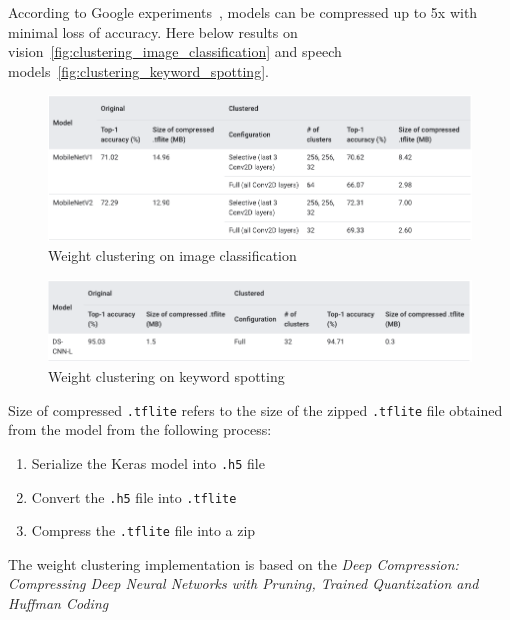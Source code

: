 According to Google experiments~\cite{tfmot:clustering}, models can be
compressed up to 5x with minimal loss of accuracy. Here below results on
vision~\autoref{fig:clustering_image_classification} and speech
models~\autoref{fig:clustering_keyword_spotting}.

\begin{figure}[ht]
    \includegraphics[width=\textwidth]{images/introduction/clustering_image_classification.png}
    \centering
    \caption{Weight clustering on image classification}\label{fig:clustering_image_classification}
\end{figure}

\begin{figure}[ht]
    \includegraphics[width=\textwidth]{images/introduction/clustering_keyword_spotting.png}
    \centering
    \caption{Weight clustering on keyword spotting}\label{fig:clustering_keyword_spotting}
\end{figure}

Size of compressed \texttt{.tflite} refers to the size of the zipped
\texttt{.tflite} file obtained from the model from the following process:

\begin{enumerate}
    \item Serialize the Keras model into \texttt{.h5} file
    \item Convert the \texttt{.h5} file into \texttt{.tflite}
    \item Compress the \texttt{.tflite} file into a zip
\end{enumerate}

The weight clustering implementation is based on the \textit{Deep Compression:
Compressing Deep Neural Networks with Pruning, Trained Quantization and Huffman
Coding}~\cite{han2015deep}~\cite{tfmot:clustering}


